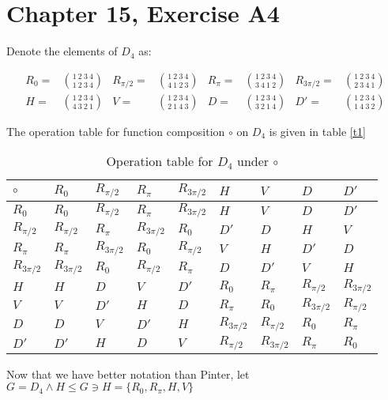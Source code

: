\documentclass[12pt]{article}
\begin{document}
\section{Chapter 15, Exercise A4}

Denote the elements of $D_4$ as:

\begin{align}
	\label{topperm}
	R_0 = & \binom{1\ 2\ 3\ 4}{1\ 2\ 3\ 4} &
	R_{\pi/2} = & \binom{1\ 2\ 3\ 4}{4\ 1\ 2\ 3} &
	R_{\pi} = & \binom{1\ 2\ 3\ 4}{3\ 4\ 1\ 2} &
	R_{3\pi/2} = & \binom{1\ 2\ 3\ 4}{2\ 3\ 4\ 1} \\
	\label{botperm}
	H  = & \binom{1\ 2\ 3\ 4}{4\ 3\ 2\ 1} &
	V  = & \binom{1\ 2\ 3\ 4}{2\ 1\ 4\ 3} &
	D = & \binom{1\ 2\ 3\ 4}{3\ 2\ 1\ 4} &
	D' = & \binom{1\ 2\ 3\ 4}{1\ 4\ 3\ 2}
\end{align}

The operation table for
function composition $\circ$
on $D_4$
is given in table \ref{t1}

\begin{table}[!ht] 
\begin{tabular}{l|llllllll}
	$\circ$ & $R_0$ & $R_{\pi/2}$ & $R_\pi$ & $R_{3\pi/2}$ & $H$ & $V$ & $D$ & $D'$	\\ \hline
	$R_0$ & $R_0$ & $R_{\pi/2}$ & $R_\pi$ & $R_{3\pi/2}$ & $H$ & $V$ & $D$ & $D'$ \\
	$R_{\pi/2}$ & $R_{\pi/2}$ & $R_\pi$ & $R_{3\pi/2}$ & $R_0$ & $D'$ & $D$ & $H$ & $V$ \\
	$R_\pi$ & $R_\pi$ & $R_{3\pi/2}$ & $R_0$ & $R_{\pi/2}$ & $V$ & $H$ & $D'$ & $D$ \\
	$R_{3\pi/2}$ & $R_{3\pi/2}$ & $R_0$ & $R_{\pi/2}$ & $R_\pi$ & $D$ & $D'$ & $V$ & $H$ 	\\
	$H$ & $H$ & $D$ & $V$ & $D'$ & $R_0$ & $R_\pi$ & $R_{\pi/2}$ & $R_{3\pi/2}$ 	\\
	$V$ & $V$ & $D'$ & $H$ & $D$ & $R_\pi$ & $R_0$ & $R_{3\pi/2}$ & $R_{\pi/2}$ 	\\
	$D$ & $D$ & $V$ & $D'$ & $H$ & $R_{3\pi/2}$ & $R_{\pi/2}$ & $R_0$ & $R_\pi$	\\
	$D'$ & $D'$ & $H$ & $D$ & $V$ & $R_{\pi/2}$ & $R_{3\pi/2}$ & $R_\pi$ & $R_0$	\\
\end{tabular}
\centering
\caption{Operation table for $D_4$ under $\circ$}
\label{t2}
\end{table}

Now that we have better notation than Pinter,
let $G = D_4 \land H \le G \ni H = \{ R_0, R_\pi, H, V \}$
\end{document}
